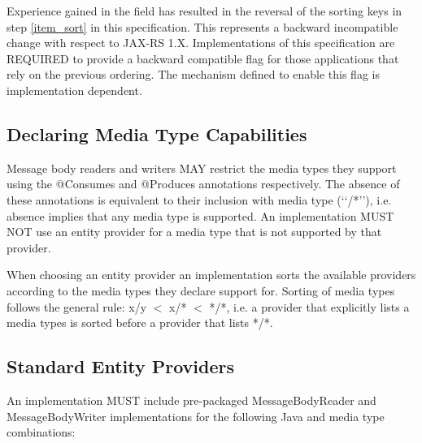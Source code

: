 Experience gained in the field has resulted in the reversal of the sorting keys in step \ref{item_sort} in this
specification. This represents a backward incompatible change with respect to JAX-RS 1.X. Implementations of this
specification are REQUIRED to provide a backward compatible flag for those applications that rely on the previous
ordering. The mechanism defined to enable this flag is implementation dependent.

\subsection{Declaring Media Type Capabilities}
\label{declaring_provider_capabilities}

Message body readers and writers MAY restrict the media types they support using the @Consumes and @Produces annotations
respectively. The absence of these annotations is equivalent to their inclusion with media type (\lq\lq*/*\rq\rq), i.e.
absence implies that any media type is supported. An implementation MUST NOT use an entity provider for a media type
that is not supported by that provider.

When choosing an entity provider an implementation sorts the available providers according to the media types they
declare support for. Sorting of media types follows the general rule: x/y $<$ x/* $<$ */*, i.e. a provider that
explicitly lists a media types is sorted before a provider that lists */*.

\subsection{Standard Entity Providers}
\label{standard_entity_providers}

An implementation MUST include pre-packaged MessageBodyReader and MessageBodyWriter implementations for the following
Java and media type combinations:


